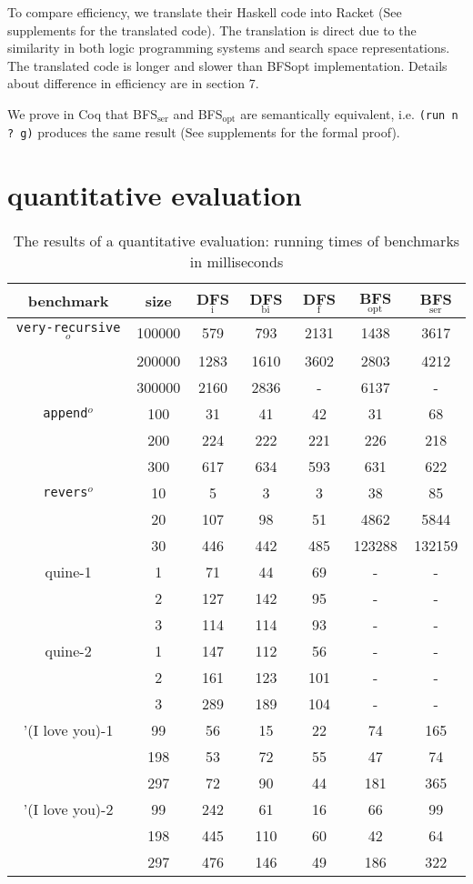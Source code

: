 \documentclass[format=acmlarge, review=true, authordraft=true]{acmart}
\newcommand{\BFSopt}[0]{BFS$_\textrm{opt}$}
\newcommand{\BFSser}[0]{BFS$_\textrm{ser}$}
\newcommand{\veryrecursiveo}[0]{\texttt{very-recursive$^o$}}
\newcommand{\appendo}[0]{\texttt{append$^o$}}
\newcommand{\reverso}[0]{\texttt{revers$^o$}}
\begin{document}
To compare efficiency, we translate their Haskell code into Racket (See 
supplements for the translated code). The translation is direct 
due to the similarity in both logic programming systems and search space 
representations. The translated code is longer and slower than BFSopt
implementation. Details about 
difference in efficiency are in section 7.

We prove in Coq that \BFSser{} and \BFSopt{} are semantically equivalent, i.e. \texttt{(run n ? g)} 
produces the same result (See supplements for the formal proof).

\section{quantitative evaluation}

\begin{table}
	\begin{tabular}{|c|c|c|c|c|c|c|}
		\hline 
		benchmark & size & DFS$_\textrm{i}$ & DFS$_\textrm{bi}$ & DFS$_\textrm{f}$ & BFS$_\textrm{opt}$ & BFS$_\textrm{ser}$  
		\\
		\hline
		\veryrecursiveo{} & 100000 &  579 &  793 & 2131 & 1438 & 3617 \\
		& 200000 & 1283 & 1610 & 3602 & 2803 & 4212 \\
		& 300000 & 2160 & 2836 &    - & 6137 &    - \\
		\hline 
		\appendo{}  & 100 &  31 &  41 &  42 &  31 &  68 \\ 
		& 200 & 224 & 222 & 221 & 226 & 218 \\ 
		& 300 & 617 & 634 & 593 & 631 & 622 \\ 
		\hline 
		\reverso{} & 10 &   5 &   3 &   3 &     38 &     85 \\ 
		& 20 & 107 &  98 &  51 &   4862 &   5844 \\
		& 30 & 446 & 442 & 485 & 123288 & 132159 \\ 
		\hline
		quine-1 & 1 &  71 &  44 & 69 & - & - \\ 
		& 2 & 127 & 142 & 95 & - & - \\ 
		& 3 & 114 & 114 & 93 & - & - \\ 
		\hline
		quine-2 & 1 & 147 & 112 &  56 & - & - \\ 
		& 2 & 161 & 123 & 101 & - & - \\ 
		& 3 & 289 & 189 & 104 & - & - \\ 
		\hline 
		'(I love you)-1 &  99 & 56 & 15 & 22 &  74 & 165 \\ 
		& 198 & 53 & 72 & 55 &  47 &  74 \\
		& 297 & 72 & 90 & 44 & 181 & 365 \\ 
		\hline
		'(I love you)-2 &  99 & 242 &  61 & 16 &  66 &  99 \\ 
		& 198 & 445 & 110 & 60 &  42 &  64 \\
		& 297 & 476 & 146 & 49 & 186 & 322 \\ 
		\hline 
	\end{tabular}
	\caption{The results of a quantitative evaluation: running times of 
	benchmarks 
		in milliseconds}
	\label{compare-efficiency}
\end{table}
\end{document}
